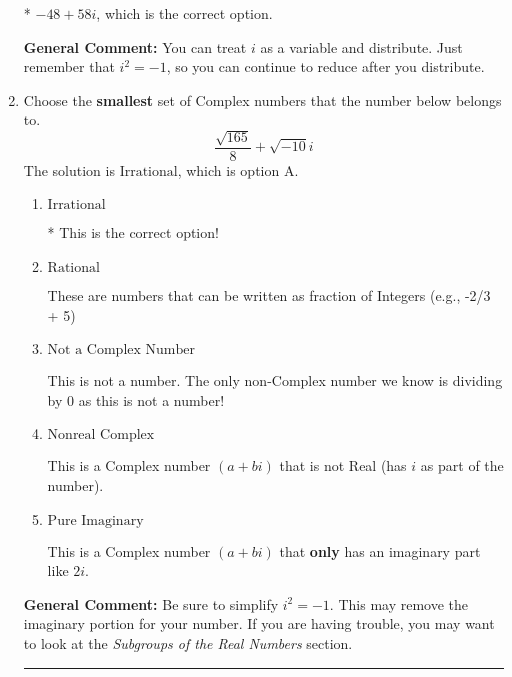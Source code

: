 \documentclass{extbook}[14pt]
\newcommand{\litem}[1]{\item #1

\rule{\textwidth}{0.4pt}}
\begin{document}
\begin{enumerate}
{\begin{enumerate}[label=\Alph*.]
* $-48 + 58 i$, which is the correct option.
\end{enumerate}

\textbf{General Comment:} You can treat $i$ as a variable and distribute. Just remember that $i^2=-1$, so you can continue to reduce after you distribute.
}
\litem{
Choose the \textbf{smallest} set of Complex numbers that the number below belongs to.
\[ \frac{\sqrt{165}}{8}+\sqrt{-10}i \]The solution is \( \text{Irrational} \), which is option A.\begin{enumerate}[label=\Alph*.]
\item \( \text{Irrational} \)

* This is the correct option!
\item \( \text{Rational} \)

These are numbers that can be written as fraction of Integers (e.g., -2/3 + 5)
\item \( \text{Not a Complex Number} \)

This is not a number. The only non-Complex number we know is dividing by 0 as this is not a number!
\item \( \text{Nonreal Complex} \)

This is a Complex number $(a+bi)$ that is not Real (has $i$ as part of the number).
\item \( \text{Pure Imaginary} \)

This is a Complex number $(a+bi)$ that \textbf{only} has an imaginary part like $2i$.
\end{enumerate}

\textbf{General Comment:} Be sure to simplify $i^2 = -1$. This may remove the imaginary portion for your number. If you are having trouble, you may want to look at the \textit{Subgroups of the Real Numbers} section.
}
\end{enumerate}
\end{document}
